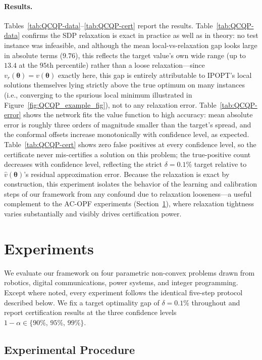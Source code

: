 \documentclass[10pt]{article} %
\theoremstyle{plain}
\theoremstyle{definition}
\theoremstyle{remark}
\begin{document}
\paragraph{Results.} Tables~\ref{tab:QCQP-data}--\ref{tab:QCQP-cert} report the results. Table~\ref{tab:QCQP-data} confirms the SDP relaxation is exact in practice as well as in theory: no test instance was infeasible, and although the mean local-vs-relaxation gap looks large in absolute terms ($9.76$), this reflects the target value's own wide range (up to $13.4$ at the $95$th percentile) rather than a loose relaxation---since $v_r(\bm{\theta}) = v(\bm{\theta})$ exactly here, this gap is entirely attributable to IPOPT's local solutions themselves lying strictly above the true optimum on many instances (i.e., converging to the spurious local minimum illustrated in Figure~\ref{fig:QCQP_example_fig}), not to any relaxation error. Table~\ref{tab:QCQP-error} shows the network fits the value function to high accuracy: mean absolute error is roughly three orders of magnitude smaller than the target's spread, and the conformal offsets increase monotonically with confidence level, as expected. Table~\ref{tab:QCQP-cert} shows zero false positives at every confidence level, so the certificate never mis-certifies a solution on this problem; the true-positive count decreases with confidence level, reflecting the strict $\delta = 0.1\%$ target relative to $\hat{v}(\bm{\theta})$'s residual approximation error. Because the relaxation is exact by construction, this experiment isolates the behavior of the learning and calibration steps of our framework from any confound due to relaxation looseness---a useful complement to the AC-OPF experiments (Section~\ref{sec:experiments}), where relaxation tightness varies substantially and visibly drives certification power.

\section{Experiments} \label{sec:experiments}

We evaluate our framework on four parametric non-convex problems drawn from robotics, digital communications, power systems, and integer programming. Except where noted, every experiment follows the identical five-step protocol described below. We fix a target optimality gap of $\delta = 0.1\%$ throughout and report certification results at the three confidence levels $1 - \alpha \in \{90\%,\, 95\%,\, 99\%\}$.

\subsection*{Experimental Procedure}
\end{document}

